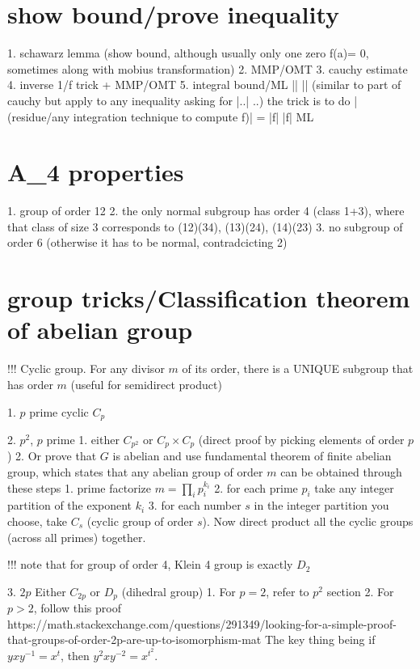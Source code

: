 {{\section*{show bound/prove inequality}
    1. schawarz lemma (show bound, although usually only one zero f(a)= 0, sometimes along with mobius transformation)
    2. MMP/OMT
    3. cauchy estimate
    4. inverse 1/f trick + MMP/OMT
    5. integral bound/ML |\int| \leq \int|| (similar to part of cauchy but apply to any inequality asking for |..| \geq ..)
        the trick is to do
        |(residue/any integration technique to compute \int f)| 
        = |\int f| 
        \leq \int |f|  
        \leq ML



    




\section*{A_4 properties}
1. group of order 12
2. the only normal subgroup has order 4 (class 1+3), where that class of size 3 corresponds to (12)(34), (13)(24), (14)(23)
3. no subgroup of order 6 (otherwise it has to be normal, contradcicting 2)

\section*{group tricks/Classification theorem of abelian group}

!!! Cyclic group. For any divisor $m$ of its order, there is a UNIQUE subgroup that has order $m$ (useful for semidirect product)



1. $p$ prime
	cyclic $C_p$

2. $p^2$, $p$ prime
	1. either $C_{p^2}$ or $C_p \times C_p$ (direct proof by picking elements of order $p$)
    2. Or prove that $G$ is abelian and use fundamental theorem of finite abelian group, which states that any abelian group of order $m$ can be obtained through these steps
    	1. prime factorize $m = \prod_i p_i^{k_i}$
    	2. for each prime $p_i$ take any integer partition of the exponent $k_i$
    	3. for each number $s$ in the integer partition you choose, take $C_s$ (cyclic group of order $s$). Now direct product all the cyclic groups (across all primes) together.

	!!! note that for group of order 4, Klein 4 group is exactly $D_2$
    
3. $2p$
	Either $C_{2p}$ or $D_p$ (dihedral group)
    	1. For $p=2$, refer to $p^2$ section
        2. For $p>2$, follow this proof https://math.stackexchange.com/questions/291349/looking-for-a-simple-proof-that-groups-of-order-2p-are-up-to-isomorphism-mat
        	The key thing being if $yxy^{-1} = x^t$, then $y^2xy^{-2} = x^{t^2}$.

}}
